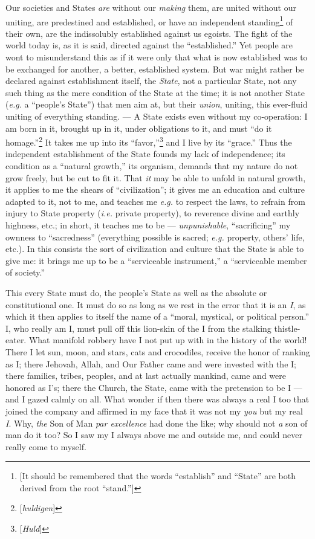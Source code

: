 Our societies and States \textit{are} without our \textit{making} them, are 
united without our uniting, are predestined and established, or have an 
independent standing\footnote{[It should be remembered that the words 
``establish'' and ``State'' are both derived from the root ``stand.'']} 
of their own, are the indissolubly established against us egoists. The fight 
of the world today is, as it is said, directed against the ``established.'' 
Yet people are wont to misunderstand this as if it were only that what is now 
established was to be exchanged for another, a better, established system. But 
war might rather be declared against establishment itself, the \textit{State}, 
not a particular State, not any such thing as the mere condition of the State 
at the time; it is not another State (\textit{e.g.} a ``people's State'') 
that men aim at, but their \textit{union}, uniting, this ever-fluid uniting of 
everything standing. --- A State exists even without my co-operation: I am born 
in it, brought up in it, under obligations to it, and must ``do it 
homage.''\footnote{[\textit{huldigen}]} It takes me up into its 
``favor,''\footnote{[\textit{Huld}]} and I live by its ``grace.'' Thus the 
independent establishment of the State founds my lack of independence; its 
condition as a ``natural growth,'' its organism, demands that my nature do 
not grow freely, but be cut to fit it. That \textit{it} may be able to unfold 
in natural growth, it applies to me the shears of ``civilization''; it gives 
me an education and culture adapted to it, not to me, and teaches me 
\textit{e.g.} to respect the laws, to refrain from injury to State property 
(\textit{i.e.} private property), to reverence divine and earthly highness, 
etc.; in short, it teaches me to be --- \textit{unpunishable}, 
``sacrificing'' my ownness to ``sacredness'' (everything possible is 
sacred; \textit{e.g.} property, others' life, etc.). In this consists the 
sort of civilization and culture that the State is able to give me: it brings 
me up to be a ``serviceable instrument,'' a ``serviceable member of 
society.''

This every State must do, the people's State as well as the absolute or 
constitutional one. It must do so as long as we rest in the error that it is 
an \textit{I}, as which it then applies to itself the name of a ``moral, 
mystical, or political person.'' I, who really am I, must pull off this 
lion-skin of the I from the stalking thistle-eater. What manifold robbery have 
I not put up with in the history of the world! There I let sun, moon, and 
stars, cats and crocodiles, receive the honor of ranking as I; there Jehovah, 
Allah, and Our Father came and were invested with the I; there families, 
tribes, peoples, and at last actually mankind, came and were honored as I's; 
there the Church, the State, came with the pretension to be I --- and I gazed 
calmly on all. What wonder if then there was always a real I too that joined 
the company and affirmed in my face that it was not my \textit{you} but my 
real \textit{I}. Why, \textit{the} Son of Man \textit{par excellence} had done 
the like; why should not \textit{a} son of man do it too? So I saw my I always 
above me and outside me, and could never really come to myself.

